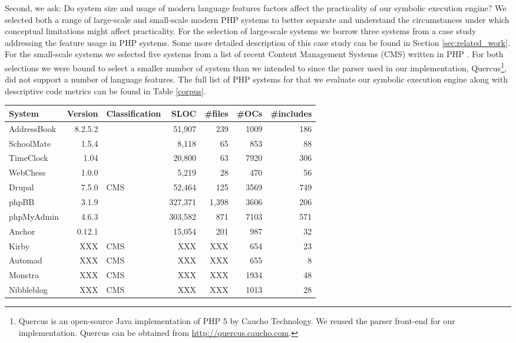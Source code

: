 \documentclass[sigconf]{acmart}
\renewcommand{\sf}[1]{\textsf{#1}}
\begin{document}
Second, we ask: Do system size and usage of modern language features
factors affect the practicality of our symbolic execution engine? We
selected both a range of large-scale and small-scale modern PHP systems to
better separate and understand the circumstances under which conceptual
limitations might affect practicality. For the selection of large-scale systems
we borrow three systems from a case study addressing the feature usage in PHP
systems. Some more detailed description of this case study can be found in
Section \ref{sec:related_work}. For the small-scale systems we selected five systems from
a list of recent Content Management Systems (CMS) written in PHP \cite{codegeekz}. For both
selections we were bound to select a smaller number of system than we intended
to since the parser used in our implementation,
\sf{Quercus}\footnote{\sf{Quercus} is an open-source Java implementation of PHP
5 by Caucho Technology. We reused the parser front-end for our implementation.
\sf{Quercus} can be obtained from \url{http://quercus.caucho.com}.}, did not
support a number of language features.
The full list of PHP systems for that we evaluate our symbolic execution engine along with descriptive code metrics can be found in Table \ref{corpus}.

\begin{table*}[t]
\centering 
	\begin{tabular}{lrp{4cm}rrrr}
	\toprule
	\textbf{System} & \textbf{Version} & \textbf{Classification} & \textbf{SLOC} &
	\textbf{\#files} & \textbf{\#OCs} & \textbf{\#includes}\\
	\midrule
	AddressBook & 8.2.5.2 &  & 51,907 & 239  & 1009 & 186\\
	SchoolMate & 1.5.4 &  & 8,118 & 65  & 853 & 88\\
	TimeClock & 1.04 &  & 20,800 & 63  & 7920 & 306\\
	WebChess & 1.0.0 &  & 5,219 & 28  & 470 & 56\\
	\midrule
	Drupal & 7.5.0 & CMS & 52,464 & 125  & 3569 & 749\\
	phpBB & 3.1.9 &  & 327,371 & 1,398  & 3606 & 206\\
	phpMyAdmin & 4.6.3 &  & 303,582 & 871  & 7103 & 571\\
	\midrule
	Anchor & 0.12.1 &  & 15,054 & 201 & 987 & 32\\
	Kirby & XXX & CMS & XXX & XXX  & 654 & 23\\
	Automad & XXX & CMS & XXX & XXX  & 655 & 8\\
	Monstra & XXX & CMS & XXX & XXX  & 1934 & 48\\
	Nibbleblog & XXX & CMS & XXX & XXX  & 1013 & 28\\
	\bottomrule
	\end{tabular}
	\caption{Corpus of twelve PHP systems. The file count includes files with a .php,
	.inc, .bit or .module extension.}
	\label{corpus}
\end{table*}
\end{document}
